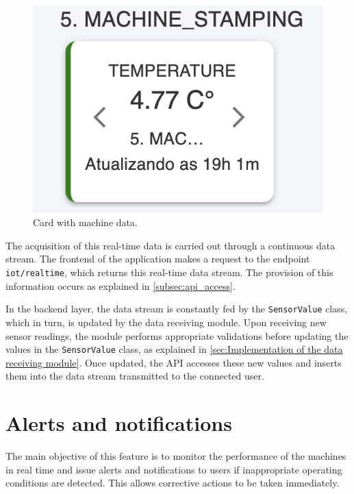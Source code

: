 \begin{figure}[htbp]
	\centering
	\includegraphics[scale=0.45]{images/machineCard.png}
	\caption{Card with machine data.}
	\label{fig:cardData}
\end{figure}

The acquisition of this real-time data is carried out through a continuous data stream. The frontend of the application makes a request to the endpoint \texttt{iot/realtime}, which returns this real-time data stream. The provision of this information occurs as explained in \ref{subsec:api_access}.

In the backend layer, the data stream is constantly fed by the \texttt{SensorValue} class, which in turn, is updated by the data receiving module. Upon receiving new sensor readings, the module performs appropriate validations before updating the values in the \texttt{SensorValue} class, as explained in \ref{sec:Implementation of the data receiving module}. Once updated, the \gls{API} accesses these new values and inserts them into the data stream transmitted to the connected user.


\section[Alerts and notifications]{Alerts and notifications}\label{sec:alertsAndNotifications}

The main objective of this feature is to monitor the performance of the machines in real time and issue alerts and notifications to users if inappropriate operating conditions are detected. This allows corrective actions to be taken immediately.

